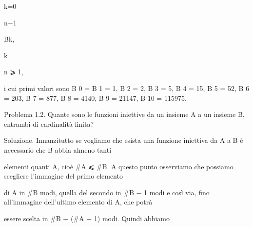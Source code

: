 \documentclass[a4paper,portrait,12pt]{article}
\begin{document}
\begin{flushleft}
k=0
\end{flushleft}





\begin{flushleft}
n$-$1
\end{flushleft}


\begin{flushleft}
Bk,
\end{flushleft}


\begin{flushleft}
k
\end{flushleft}





\begin{flushleft}
n ⩾ 1,
\end{flushleft}





\begin{flushleft}
i cui primi valori sono B 0 = B 1 = 1, B 2 = 2, B 3 = 5, B 4 = 15, B 5 = 52, B 6 = 203, B 7 = 877, B 8 = 4140, B 9 = 21147, B 10 = 115975.
\end{flushleft}


\begin{flushleft}
Problema 1.2. Quante sono le funzioni iniettive da un insieme A a un insieme B, entrambi di cardinalit\`{a} finita?
\end{flushleft}


\begin{flushleft}
Soluzione. Innanzitutto se vogliamo che esista una funzione iniettiva da A a B \`{e} necessario che B abbia almeno tanti
\end{flushleft}


\begin{flushleft}
elementi quanti A, cio\`{e} \#A ⩽ \#B. A questo punto osserviamo che possiamo scegliere l'immagine del primo elemento
\end{flushleft}


\begin{flushleft}
di A in \#B modi, quella del secondo in \#B $-$ 1 modi e così via, fino all'immagine dell'ultimo elemento di A, che potr\`{a}
\end{flushleft}


\begin{flushleft}
essere scelta in \#B $-$ (\#A $-$ 1) modi. Quindi abbiamo
\end{flushleft}
\end{document}
